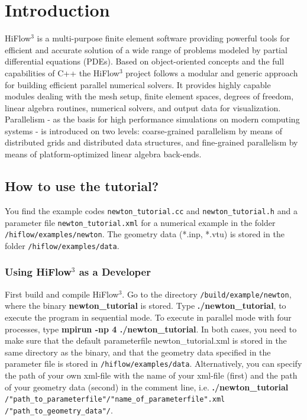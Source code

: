 \documentclass[a4paper, 11pt, twoside]{article}
\begin{document}


\tableofcontents

\newpage
\pagestyle{plain}
\vspace{0.5cm}

\section{Introduction}
HiFlow$^3$ is a multi-purpose finite element software providing powerful tools for efficient and accurate solution of a wide range of problems modeled by partial differential equations (PDEs). Based on object-oriented concepts and the full capabilities of C++ the HiFlow$^3$ project follows a modular and generic approach for building efficient parallel numerical solvers. It provides highly capable modules dealing with the mesh setup, finite element spaces, degrees of freedom, linear algebra routines, numerical solvers, and output data for visualization. Parallelism - as the basis for high performance simulations on modern computing systems - is introduced on two levels: coarse-grained parallelism by means of distributed grids and distributed data structures, and fine-grained parallelism by means of platform-optimized linear algebra back-ends.

\subsection{How to use the tutorial?}
You find the example codes \verb+newton_tutorial.cc+ and \verb+newton_tutorial.h+ and a parameter file \verb+newton_tutorial.xml+ for a numerical example in the folder \verb'/hiflow/examples/newton'. The geometry data (*.inp, *.vtu) is stored in the folder \verb'/hiflow/examples/data'.

\subsubsection{Using HiFlow$^3$ as a Developer}\label{sectiondeveloper}
First build and compile HiFlow$^3$. Go to the directory \verb'/build/example/newton', where the binary \textbf{newton\_tutorial} is stored. Type \textbf{./newton\_tutorial}, to execute the program in sequential mode. To execute in parallel mode  with four processes, type \textbf{mpirun -np 4 ./newton\_tutorial}. In both cases, you need to make sure that the default parameterfile newton\_tutorial.xml is stored in the same directory as the binary, and that the geometry data specified in the parameter file is stored in \verb'/hiflow/examples/data'. Alternatively, you can specify the path of your own xml-file with the name of your xml-file (first) and the path of your geometry data (second) in the comment line, i.e. \textbf{./newton\_tutorial} \verb'/"path_to_parameterfile"/"name_of_parameterfile".xml' \verb'/"path_to_geometry_data"/'.
\end{document}
